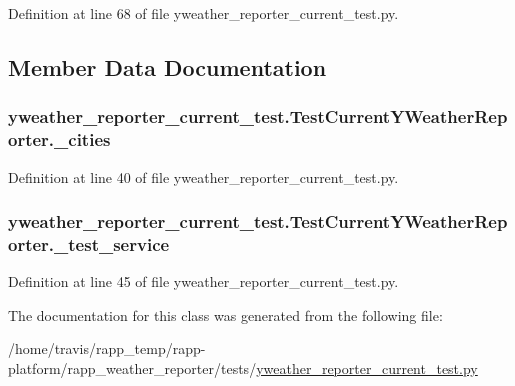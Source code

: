 Definition at line 68 of file yweather\-\_\-reporter\-\_\-current\-\_\-test.\-py.



\subsection{Member Data Documentation}
\hypertarget{classyweather__reporter__current__test_1_1TestCurrentYWeatherReporter_aae34ef78f844aa046cac1dbd8e4c9739}{
\subsubsection[{\-\_\-cities}]{\setlength{\rightskip}{0pt plus 5cm}yweather\-\_\-reporter\-\_\-current\-\_\-test.\-Test\-Current\-Y\-Weather\-Reporter.\-\_\-cities\hspace{0.3cm}{\ttfamily [private]}}}\label{classyweather__reporter__current__test_1_1TestCurrentYWeatherReporter_aae34ef78f844aa046cac1dbd8e4c9739}


Definition at line 40 of file yweather\-\_\-reporter\-\_\-current\-\_\-test.\-py.

\hypertarget{classyweather__reporter__current__test_1_1TestCurrentYWeatherReporter_aca6a3b24456b3a04a6fbe9cd07c94791}{
\subsubsection[{\-\_\-test\-\_\-service}]{\setlength{\rightskip}{0pt plus 5cm}yweather\-\_\-reporter\-\_\-current\-\_\-test.\-Test\-Current\-Y\-Weather\-Reporter.\-\_\-test\-\_\-service\hspace{0.3cm}{\ttfamily [private]}}}\label{classyweather__reporter__current__test_1_1TestCurrentYWeatherReporter_aca6a3b24456b3a04a6fbe9cd07c94791}


Definition at line 45 of file yweather\-\_\-reporter\-\_\-current\-\_\-test.\-py.



The documentation for this class was generated from the following file\-:\begin{DoxyCompactItemize}
\item 
/home/travis/rapp\-\_\-temp/rapp-\/platform/rapp\-\_\-weather\-\_\-reporter/tests/\hyperlink{yweather__reporter__current__test_8py}{yweather\-\_\-reporter\-\_\-current\-\_\-test.\-py}\end{DoxyCompactItemize}
